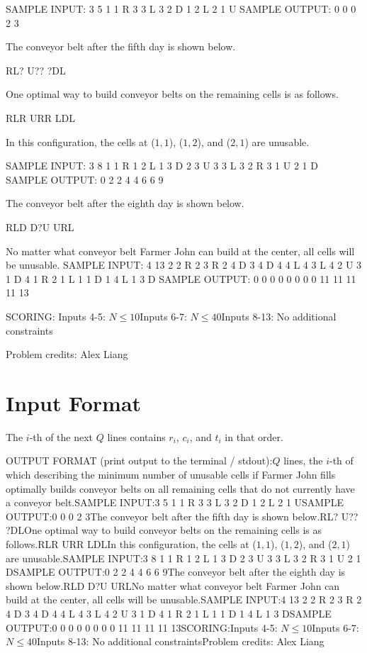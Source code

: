 \documentclass[12pt]{article}
\begin{document}
SAMPLE INPUT:
3 5
1 1 R
3 3 L
3 2 D
1 2 L
2 1 U
SAMPLE OUTPUT: 
0
0
0
2
3

The conveyor belt after the fifth day is shown below.


RL?
U??
?DL

One optimal way to build conveyor belts on the remaining cells is as follows.


RLR
URR
LDL

In this configuration, the cells at ($1, 1$), ($1, 2$), and ($2, 1$) are
unusable.

SAMPLE INPUT:
3 8
1 1 R
1 2 L
1 3 D
2 3 U
3 3 L
3 2 R
3 1 U
2 1 D
SAMPLE OUTPUT: 
0
2
2
4
4
6
6
9

The conveyor belt after the eighth day is shown below.


RLD
D?U
URL

No matter what conveyor belt Farmer John can build at the center, all cells 
will be unusable.
SAMPLE INPUT:
4 13
2 2 R
2 3 R
2 4 D
3 4 D
4 4 L
4 3 L
4 2 U
3 1 D
4 1 R
2 1 L
1 1 D
1 4 L
1 3 D
SAMPLE OUTPUT: 
0
0
0
0
0
0
0
0
11
11
11
11
13

SCORING:
Inputs 4-5: $N \le 10$Inputs 6-7: $N \le 40$Inputs 8-13: No additional constraints


Problem credits: Alex Liang



\section*{Input Format}
The $i$-th of the next $Q$ lines contains $r_i$, $c_i$, and $t_i$ in that order.

OUTPUT FORMAT (print output to the terminal / stdout):$Q$ lines, the $i$-th of which describing the minimum number of unusable cells
if Farmer John fills optimally builds conveyor belts on all remaining cells that
do not currently have a conveyor belt.SAMPLE INPUT:3 5
1 1 R
3 3 L
3 2 D
1 2 L
2 1 USAMPLE OUTPUT:0
0
0
2
3The conveyor belt after the fifth day is shown below.RL?
U??
?DLOne optimal way to build conveyor belts on the remaining cells is as follows.RLR
URR
LDLIn this configuration, the cells at ($1, 1$), ($1, 2$), and ($2, 1$) are
unusable.SAMPLE INPUT:3 8
1 1 R
1 2 L
1 3 D
2 3 U
3 3 L
3 2 R
3 1 U
2 1 DSAMPLE OUTPUT:0
2
2
4
4
6
6
9The conveyor belt after the eighth day is shown below.RLD
D?U
URLNo matter what conveyor belt Farmer John can build at the center, all cells 
will be unusable.SAMPLE INPUT:4 13
2 2 R
2 3 R
2 4 D
3 4 D
4 4 L
4 3 L
4 2 U
3 1 D
4 1 R
2 1 L
1 1 D
1 4 L
1 3 DSAMPLE OUTPUT:0
0
0
0
0
0
0
0
11
11
11
11
13SCORING:Inputs 4-5: $N \le 10$Inputs 6-7: $N \le 40$Inputs 8-13: No additional constraintsProblem credits: Alex Liang
\end{document}
